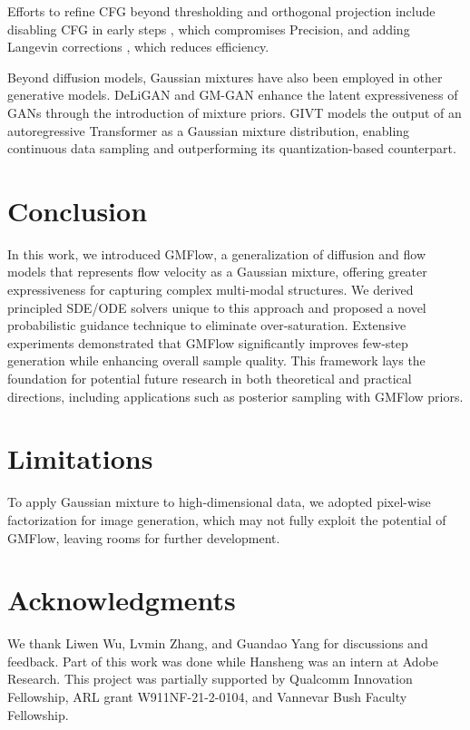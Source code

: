 \documentclass{article}
\theoremstyle{custom}
\theoremstyle{definition}
\theoremstyle{remark}
\newcommand{\methodname}{{GMFlow}}
\begin{document}
Efforts to refine CFG beyond thresholding \cite{Saharia2022photorealistic} and orthogonal projection \cite{sadat2024eliminating} include disabling CFG in early steps \cite{intervalcfg}, which compromises Precision, and adding Langevin corrections \cite{bradley2024cfg}, which reduces efficiency.

Beyond diffusion models, Gaussian mixtures have also been employed in other generative models. DeLiGAN \cite{DeLiGAN} and GM-GAN \cite{GM-GAN} enhance the latent expressiveness of GANs through the introduction of mixture priors. GIVT \cite{gvit} models the output of an autoregressive Transformer as a Gaussian mixture distribution, enabling continuous data sampling and outperforming its quantization-based counterpart.
%
 \section{Conclusion}
In this work, we introduced \methodname{}, a generalization of diffusion and flow models that represents flow velocity as a Gaussian mixture, offering greater expressiveness for capturing complex multi-modal structures. We derived principled SDE/ODE solvers unique to this approach and proposed a novel probabilistic guidance technique to eliminate over-saturation. Extensive experiments demonstrated that \methodname{} significantly improves few-step generation while enhancing overall sample quality. This framework lays the foundation for potential future research in both theoretical and practical directions, including applications such as posterior sampling with GMFlow priors.

\section*{Limitations}
To apply Gaussian mixture to high-dimensional data, we adopted pixel-wise factorization for image generation, which may not fully exploit the potential of \methodname{}, leaving rooms for further development.



\section*{Acknowledgments}
We thank Liwen Wu, Lvmin Zhang, and Guandao Yang for discussions and feedback. 
Part of this work was done while Hansheng was an intern at Adobe 
Research.
This project was partially supported by Qualcomm Innovation Fellowship, ARL grant W911NF-21-2-0104, and Vannevar Bush Faculty Fellowship.
\end{document}
